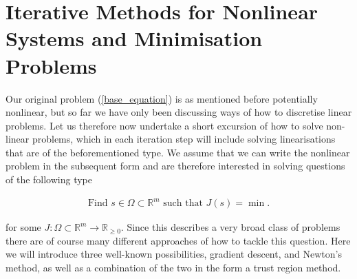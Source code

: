 \documentclass[../draft_1.tex]{subfiles}
\begin{document}

\section{Iterative Methods for Nonlinear Systems and Minimisation Problems}
\label{iterative_method}
Our original problem (\ref{base_equation}) is as mentioned before potentially nonlinear, but so far we have only been discussing ways of how to discretise linear problems. Let us therefore now undertake a short excursion of how to solve non-linear problems, which in each iteration step will include solving linearisations that are of the beforementioned type. We assume that we can write the nonlinear problem in the subsequent form and are therefore interested in solving questions of the following type 

\begin{ceqn}
	\begin{align}
	\text{Find } s \in \Omega \subset \mathbb{R}^m \text{ such that } J(s) = \min. 
	\end{align}
\end{ceqn}
for some $J: \Omega \subset \mathbb{R}^m \rightarrow \mathbb{R}_{\geq 0}$. Since this describes a very broad class of problems there are of course many different approaches of how to tackle this question. Here we will introduce three well-known possibilities, gradient descent, and Newton's method, as well as a combination of the two in the form a trust region method. 
\end{document}
